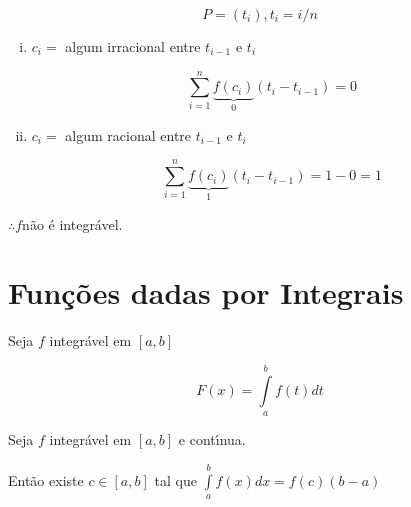 \documentclass{book}
\begin{document}
\begin{sol}

\[
P = \left( {t_i } \right),t_i = i / n
\]


\begin{enumerate} [i)]

\item $c_i = $ algum irracional entre $t_{i - 1} $ e $t_i $

\[
\sum\limits_{i = 1}^n {\underbrace {f\left( {c_i } \right)}_0\left( {t_i -
t_{i - 1} } \right)} = 0
\]


\item $c_i = $ algum racional entre $t_{i - 1} $ e $t_i $

\[
\sum\limits_{i = 1}^n {\underbrace {f\left( {c_i } \right)}_1\left( {t_i -
t_{i - 1} } \right)} = 1 - 0 = 1
\]


\end{enumerate}

$\therefore f$n\~ao \'{e} integr\'avel.

\end{sol}


\section{Fun\c c\~{o}es dadas por Integrais} \label{sec06}



Seja $f$ integr\'avel em $\left[ {a,b} \right]$

\[
F\left( x \right) = \int\limits_a^b {f\left( t \right)dt}
\]


\begin{teo}

Seja $f$ integr\'avel em $\left[ {a,b} \right]$ e cont\'{\i}nua.

Ent\~ao existe $c \in \left[ {a,b} \right]$ tal que $\int\limits_a^b
{f\left( x \right)dx} = f\left( c \right)\left( {b - a} \right)$

\end{teo}


\end{document}
